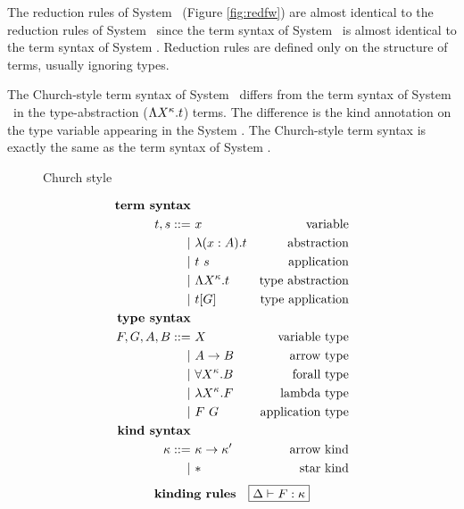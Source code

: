 The reduction rules of System \Fw\ (Figure \ref{fig:redfw}) are almost identical
to the reduction rules of System \F\ since the term syntax of System \Fw\ is
almost identical to the term syntax of System \F. Reduction rules are defined
only on the structure of terms, usually ignoring types.

The Church-style term syntax of System \Fw\ differs from the term syntax of
System \F\ in the type-abstraction ($\Lambda X^\kappa.t$) terms. The difference is
the kind annotation on the type variable appearing in the System \Fw.
The Church-style term syntax is exactly the same as the term syntax of
System \F.

\begin{figure}
\begin{singlespace}
\begin{minipage}{.46\textwidth}
        \begin{center}Church style\end{center}\vspace*{-1em}
\def\baselinestretch{0}
\small
\begin{align*}
\textbf{term syntax} \\
t,s ::= &~ x               & \text{variable}    \\
      | &~ \lambda(x:A) . t     & \text{abstraction} \\
      | &~ t ~ s           & \text{application} \\
      | &~ \Lambda X^\kappa . t & \text{type abstraction} \\
      | &~ t [G]           & \text{type application} \\
\textbf{type syntax} \\
F,G,A,B ::= &~ X                  & \text{variable type} \\
          | &~ A -> B             & \text{arrow type} \\
          | &~ \forall X^\kappa.B & \text{forall type}   \\
          | &~ \lambda X^\kappa.F      & \text{lambda type}   \\
          | &~ F ~ G              & \text{application type}   \\
\textbf{kind syntax} \\
\kappa ::= &~ \kappa -> \kappa' & \text{arrow kind} \\
         | &~ *                 & \text{star kind}   \\
\end{align*}
\[ \textbf{kinding rules} \quad \framebox{$ \Delta |- F:\kappa $} \]\vspace*{-1em}

\end{minipage}
\end{singlespace}
\end{figure}
